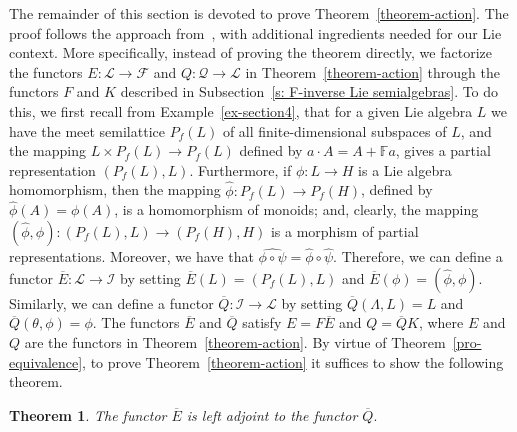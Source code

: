 \documentclass{amsart}
\newcommand{\F}{\mathbb{F}}
\newcommand{\0}{{\vartheta}}
\newtheorem{thm}{Theorem}[section]
\theoremstyle{definition}
\theoremstyle{remark}
\numberwithin{equation}{section}
\newtheorem*{Theorem A}{\textbf{Theorem A}}
\newtheorem*{Corollary E}{\textbf{Corollary E}}
\newtheorem*{Corollary F}{\textbf{Corollary F}}
\newtheorem*{Theorem B}{\textbf{Theorem B}}
\newtheorem*{Theorem C}{\textbf{Theorem C}}
\newtheorem*{Theorem D}{\textbf{Theorem B}}
\newtheorem*{p a}{\textbf{Proof of  Theorem A}}
\newtheorem*{p b}{\textbf{Proof of Theorem B}}
\newtheorem*{p c}{\textbf{Proof of  Theorem C}}
\newtheorem*{p d}{\textbf{Proof of  Theorem D}}
\begin{document}
The remainder of this section is devoted to  prove Theorem~\ref{theorem-action}. The proof follows the approach from~\cite{Szendrei}, with additional ingredients needed for our Lie context. More specifically, instead of proving the theorem directly,  we factorize the functors $E:\mathcal{L}\to \mathcal{F}$ and $Q:\mathcal{Q}\to \mathcal{L}$ in Theorem~\ref{theorem-action}  through the functors $F$ and $K$ described in Subsection~\ref{s: F-inverse Lie semialgebras}. To do this, we first recall from Example~\ref{ex-section4}, that for a given Lie algebra $L$   we have  the meet semilattice $P_f(L)$ of all finite-dimensional subspaces of $L$, and the mapping $L\times P_f(L) \to  P_f(L)$ defined by $a\cdot A=A+\F a$, gives a partial representation $(P_f(L),L)$. Furthermore, if $\phi: L\to H$ is a Lie algebra homomorphism, then the mapping $\widehat\phi:P_f(L)\to P_f(H)$, defined by  $\widehat{\phi}(A)=\phi(A)$, is a homomorphism of monoids; and, clearly, the mapping $(\widehat\phi,\phi):(P_f(L),L)\to  (P_f(H), H)$ is a morphism of partial representations. Moreover, we have that $\widehat{\phi\circ\psi}=\widehat\phi\circ \widehat\psi$.  Therefore, we can define a functor $\overline{E}: \mathcal{L}\to \mathcal{I}$ by setting $\overline{E}(L)=(P_f(L),L)$ and $\overline{E}(\phi)= (\widehat{\phi}, \phi)$. Similarly, we can define a functor $\overline{Q}:\mathcal{I}\to \mathcal{L}$ by setting  $\overline{Q}(\Lambda,L)=L$ and $\overline{Q}(\theta, \phi)=\phi$. The functors $\overline E$ and $\overline{Q}$ satisfy  $E=F\overline{E}$ and $Q=\overline{Q}K$, where $E$ and $Q$ are the functors in Theorem~\ref{theorem-action}. By virtue of Theorem~\ref{pro-equivalence}, to prove Theorem~\ref{theorem-action} it suffices to show the following theorem.

\begin{thm}
The functor $\overline{E}$ is left adjoint to the functor $\overline{Q}.$
\end{thm}
\end{document}
